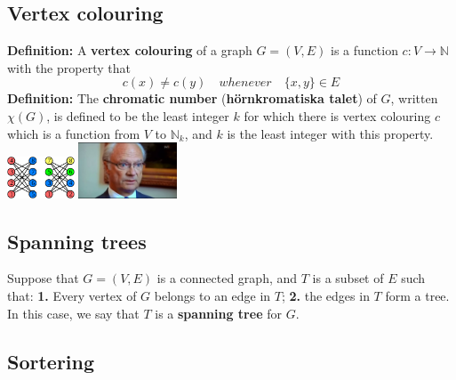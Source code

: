 \documentclass{article}
\begin{document}
\begin{multicols}{2}
\subsection{Vertex colouring}
\textbf{Definition:} A \textbf{vertex colouring} of a graph $G = (V,E)$ is a function $c: V \rightarrow \mathbb{N}$ with the property that $$c(x) \neq c(y) \quad whenever \quad \{x,y\} \in E$$
\newline
\textbf{Definition:} The \textbf{chromatic number} (\textbf{hörnkromatiska talet}) of $G$, written $\chi(G)$, is defined to be the least integer $k$ for which there is vertex colouring $c$ which is a function from $V$ to $\mathbb{N}_k$, and $k$ is the least integer with this property.\\

\includegraphics[width=0.15\textwidth]{images/greedy}
\includegraphics[width=0.22\textwidth]{images/knug} 

\subsection{Spanning trees}
Suppose that $G=(V,E)$ is a connected graph, and $T$ is a subset of $E$ such that: \textbf{1.} Every vertex of $G$ belongs to an edge in $T$; \textbf{2.} the edges in $T$ form a tree. In this case, we say that $T$ is a \textbf{spanning tree} for $G$.

\subsection{Sortering}

\end{multicols}
\end{document}
